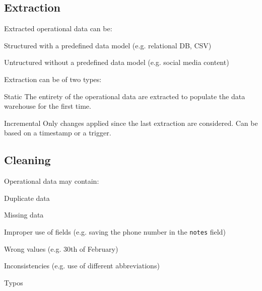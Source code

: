 \subsection{Extraction}

Extracted operational data can be:
\begin{descriptionlist}
    \item[Structured] 
        with a predefined data model (e.g. relational DB, CSV)

    \item[Untructured] 
        without a predefined data model (e.g. social media content)
\end{descriptionlist}

Extraction can be of two types:
\begin{descriptionlist}
    \item[Static] 
        The entirety of the operational data are extracted to populate the
        data warehouse for the first time.
    
    \item[Incremental] 
        Only changes applied since the last extraction are considered.
        Can be based on a timestamp or a trigger.
\end{descriptionlist}


\subsection{Cleaning}

Operational data may contain:
\begin{descriptionlist}
    \item[Duplicate data] 
    \item[Missing data] 
    \item[Improper use of fields] (e.g. saving the phone number in the \texttt{notes} field)
    \item[Wrong values] (e.g. 30th of February)
    \item[Inconsistencies] (e.g. use of different abbreviations)
    \item[Typos]    
\end{descriptionlist}

